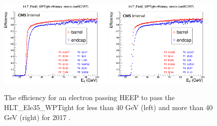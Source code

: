 \begin{figure}[h!]
\begin{center}
\includegraphics[width=0.49\textwidth]{figures/Zprime/2017/trigger/eff_Ele35_part1.png}
\includegraphics[width=0.49\textwidth]{figures/Zprime/2017/trigger/eff_Ele35_part2.png}
\caption{The efficiency for an electron passing HEEP to pass the HLT\_Ele35\_WPTight for \et less than 40 GeV (left) and \et more than 40 GeV (right) for 2017 \cite{CMS-AN-2018-021}.}
\label{fig:Ele35_2017}
\end{center}
\end{figure}
